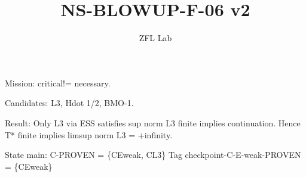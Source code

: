 \documentclass[11pt]{article}
\title{NS-BLOWUP-F-06 v2}
\author{ZFL Lab}
\begin{document}
\maketitle
Mission: critical!= necessary.

Candidates: L3, Hdot 1/2, BMO-1.

Result: Only L3 via ESS satisfies sup norm L3 finite implies continuation.
Hence T* finite implies limsup norm L3 = +infinity.

State main: C-PROVEN = \{CEweak, CL3\}
Tag checkpoint-C-E-weak-PROVEN = \{CEweak\}
\end{document}
